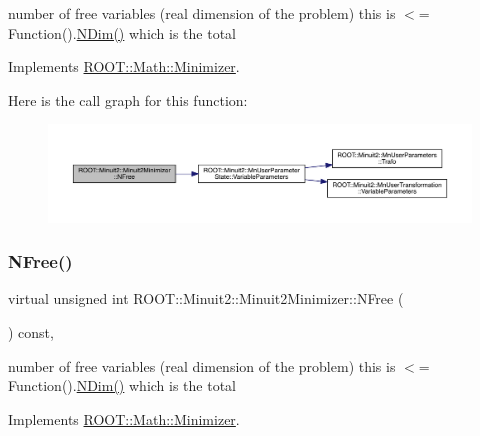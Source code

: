 number of free variables (real dimension of the problem) this is $<$= Function().\mbox{\hyperlink{classROOT_1_1Minuit2_1_1Minuit2Minimizer_a6ed2c7d99296e222f0f43295e302eb9e}{N\+Dim()}} which is the total 

Implements \mbox{\hyperlink{classROOT_1_1Math_1_1Minimizer_a75a7cd8dc0d764ecc9d82dd8f83aab24}{R\+O\+O\+T\+::\+Math\+::\+Minimizer}}.

Here is the call graph for this function\+:
\nopagebreak
\begin{figure}[H]
\begin{center}
\leavevmode
\includegraphics[width=350pt]{d0/d9c/classROOT_1_1Minuit2_1_1Minuit2Minimizer_a0aa136c5a94d1e5c6bfcbfb98da7ad2d_cgraph}
\end{center}
\end{figure}
\mbox{\label{classROOT_1_1Minuit2_1_1Minuit2Minimizer_a0aa136c5a94d1e5c6bfcbfb98da7ad2d}} 
\subsubsection{\texorpdfstring{NFree()}{NFree()}\hspace{0.1cm}{\footnotesize\ttfamily [3/3]}}
{\footnotesize\ttfamily virtual unsigned int R\+O\+O\+T\+::\+Minuit2\+::\+Minuit2\+Minimizer\+::\+N\+Free (\begin{DoxyParamCaption}{ }\end{DoxyParamCaption}) const\hspace{0.3cm}{\ttfamily [inline]}, {\ttfamily [virtual]}}

number of free variables (real dimension of the problem) this is $<$= Function().\mbox{\hyperlink{classROOT_1_1Minuit2_1_1Minuit2Minimizer_a6ed2c7d99296e222f0f43295e302eb9e}{N\+Dim()}} which is the total 

Implements \mbox{\hyperlink{classROOT_1_1Math_1_1Minimizer_a75a7cd8dc0d764ecc9d82dd8f83aab24}{R\+O\+O\+T\+::\+Math\+::\+Minimizer}}.

